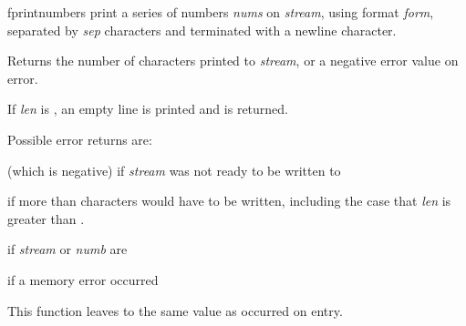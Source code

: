 \begin{DoxyDocu}{fprintnumbers}
\label{numberline_8c_a8c684ce4e137661fd7a62c0d489db9ef_a8c684ce4e137661fd7a62c0d489db9ef}
print a series of numbers {\itshape nums} on {\itshape stream}, using  format {\itshape form}, separated by {\itshape sep} characters and terminated with a newline character.

\begin{DoxyReturn}{Returns}
the number of characters printed to {\itshape stream}, or a negative error value on error.
\end{DoxyReturn}
If {\itshape len} is , an empty line is printed and  is returned.

Possible error returns are:
\begin{DoxyItemize}
\item {} (which is negative) if {\itshape stream} was not ready to be written to
\item {} if more than  characters would have to be written, including the case that {\itshape len} is greater than .
\item {} if {\itshape stream} or {\itshape numb} are 
\item {} if a memory error occurred
\end{DoxyItemize}

This function leaves  to the same value as occurred on entry.

\end{DoxyDocu}
